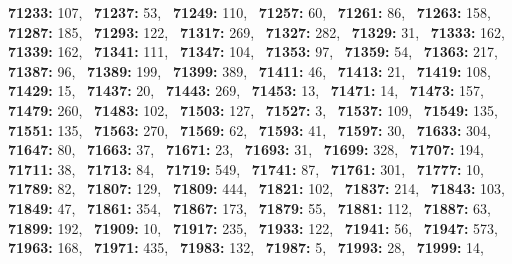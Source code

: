 \textbf{71233:} 107,\allowbreak~ 
\textbf{71237:} 53,\allowbreak~ 
\textbf{71249:} 110,\allowbreak~ 
\textbf{71257:} 60,\allowbreak~ 
\textbf{71261:} 86,\allowbreak~ 
\textbf{71263:} 158,\allowbreak~ 
\textbf{71287:} 185,\allowbreak~ 
\textbf{71293:} 122,\allowbreak~ 
\textbf{71317:} 269,\allowbreak~ 
\textbf{71327:} 282,\allowbreak~ 
\textbf{71329:} 31,\allowbreak~ 
\textbf{71333:} 162,\allowbreak~ 
\textbf{71339:} 162,\allowbreak~ 
\textbf{71341:} 111,\allowbreak~ 
\textbf{71347:} 104,\allowbreak~ 
\textbf{71353:} 97,\allowbreak~ 
\textbf{71359:} 54,\allowbreak~ 
\textbf{71363:} 217,\allowbreak~ 
\textbf{71387:} 96,\allowbreak~ 
\textbf{71389:} 199,\allowbreak~ 
\textbf{71399:} 389,\allowbreak~ 
\textbf{71411:} 46,\allowbreak~ 
\textbf{71413:} 21,\allowbreak~ 
\textbf{71419:} 108,\allowbreak~ 
\textbf{71429:} 15,\allowbreak~ 
\textbf{71437:} 20,\allowbreak~ 
\textbf{71443:} 269,\allowbreak~ 
\textbf{71453:} 13,\allowbreak~ 
\textbf{71471:} 14,\allowbreak~ 
\textbf{71473:} 157,\allowbreak~ 
\textbf{71479:} 260,\allowbreak~ 
\textbf{71483:} 102,\allowbreak~ 
\textbf{71503:} 127,\allowbreak~ 
\textbf{71527:} 3,\allowbreak~ 
\textbf{71537:} 109,\allowbreak~ 
\textbf{71549:} 135,\allowbreak~ 
\textbf{71551:} 135,\allowbreak~ 
\textbf{71563:} 270,\allowbreak~ 
\textbf{71569:} 62,\allowbreak~ 
\textbf{71593:} 41,\allowbreak~ 
\textbf{71597:} 30,\allowbreak~ 
\textbf{71633:} 304,\allowbreak~ 
\textbf{71647:} 80,\allowbreak~ 
\textbf{71663:} 37,\allowbreak~ 
\textbf{71671:} 23,\allowbreak~ 
\textbf{71693:} 31,\allowbreak~ 
\textbf{71699:} 328,\allowbreak~ 
\textbf{71707:} 194,\allowbreak~ 
\textbf{71711:} 38,\allowbreak~ 
\textbf{71713:} 84,\allowbreak~ 
\textbf{71719:} 549,\allowbreak~ 
\textbf{71741:} 87,\allowbreak~ 
\textbf{71761:} 301,\allowbreak~ 
\textbf{71777:} 10,\allowbreak~ 
\textbf{71789:} 82,\allowbreak~ 
\textbf{71807:} 129,\allowbreak~ 
\textbf{71809:} 444,\allowbreak~ 
\textbf{71821:} 102,\allowbreak~ 
\textbf{71837:} 214,\allowbreak~ 
\textbf{71843:} 103,\allowbreak~ 
\textbf{71849:} 47,\allowbreak~ 
\textbf{71861:} 354,\allowbreak~ 
\textbf{71867:} 173,\allowbreak~ 
\textbf{71879:} 55,\allowbreak~ 
\textbf{71881:} 112,\allowbreak~ 
\textbf{71887:} 63,\allowbreak~ 
\textbf{71899:} 192,\allowbreak~ 
\textbf{71909:} 10,\allowbreak~ 
\textbf{71917:} 235,\allowbreak~ 
\textbf{71933:} 122,\allowbreak~ 
\textbf{71941:} 56,\allowbreak~ 
\textbf{71947:} 573,\allowbreak~ 
\textbf{71963:} 168,\allowbreak~ 
\textbf{71971:} 435,\allowbreak~ 
\textbf{71983:} 132,\allowbreak~ 
\textbf{71987:} 5,\allowbreak~ 
\textbf{71993:} 28,\allowbreak~ 
\textbf{71999:} 14,\allowbreak~ 
